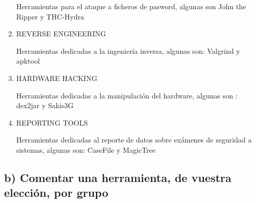 \documentclass[a4paper]{article}
\begin{document}
\begin{enumerate}
Herramientas para el ataque a ficheros de pasword, algunas son John the Ripper y THC-Hydra




\item REVERSE ENGINEERING

Herramientas dedicadas a la ingeniería inversa, algunas son: Valgrind y apktool

\item HARDWARE HACKING

Herramientas dedicadas a la manipulación del hardware, algunas son : dex2jar y Sakis3G

\item REPORTING TOOLS

Herramientas dedicadas al reporte de datos sobre exámenes de seguridad a sistemas, algunas son: CaseFile y MagicTree


\end{enumerate}




\subsection{b) Comentar una herramienta, de vuestra elección, por grupo}
\end{document}

